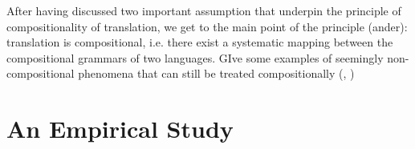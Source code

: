 \documentclass{report}
\theoremstyle{definition}
\theoremstyle{plain}
\begin{document}
After having discussed two important assumption that underpin the principle of compositionality of translation, we get to the main point of the principle (ander): translation is compositional, i.e. there exist a systematic mapping between the compositional grammars of two languages.
GIve some examples of seemingly non-compositional phenomena that can still be treated compositionally (\cite{landsbergen1989power}, \cite{rosetta1994compositional})












%
%

\chapter{An Empirical Study}
\end{document}
